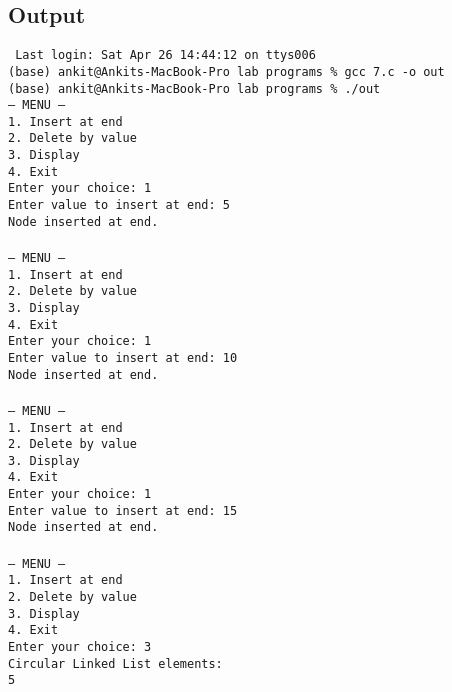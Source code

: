 \documentclass[12pt,a4paper]{article}
\begin{document}
\subsection*{Output}
\begin{tcolorbox}[terminalstyle, title=Sample Output]
\texttt{
Last login: Sat Apr 26 14:44:12 on ttys006\\
(base) ankit@Ankits-MacBook-Pro lab programs \% gcc 7.c -o out\\
(base) ankit@Ankits-MacBook-Pro lab programs \% ./out\\
--- MENU ---\\
1. Insert at end\\
2. Delete by value\\
3. Display\\
4. Exit\\
Enter your choice: 1\\
Enter value to insert at end: 5\\
Node inserted at end.\\
\\
--- MENU ---\\
1. Insert at end\\
2. Delete by value\\
3. Display\\
4. Exit\\
Enter your choice: 1\\
Enter value to insert at end: 10\\
Node inserted at end.\\
\\
--- MENU ---\\
1. Insert at end\\
2. Delete by value\\
3. Display\\
4. Exit\\
Enter your choice: 1\\
Enter value to insert at end: 15\\
Node inserted at end.\\
\\
--- MENU ---\\
1. Insert at end\\
2. Delete by value\\
3. Display\\
4. Exit\\
Enter your choice: 3\\
Circular Linked List elements:\\
5  \\
}
\end{tcolorbox}
\end{document}
